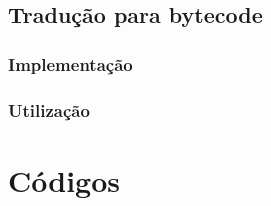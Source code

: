 \documentclass[12pt,a4paper,twoside]{report}
\begin{document}
\section{Tradução para bytecode}

\subsection{Implementação}

\subsection{Utilização}


\chapter{Códigos}
\end{document}
